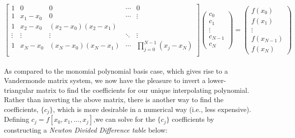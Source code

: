 \documentclass[paper=a4, fontsize=11pt]{scrartcl} %
\numberwithin{equation}{section} %
\numberwithin{figure}{section} %
\numberwithin{table}{section} %
\begin{document}
$$\left[ \begin{array}{ccccc}
1 	  & 0 	            & 0 			   & \cdots   & 0 \\
1         & x_1-x_0 &  0                                &\cdots   &\vdots \\
1         &x_2-x_0  & (x_2-x_0)(x_2-x_1) &              & \\
\vdots & \vdots    & \vdots		             & \ddots  & \vdots \\
1         &x_N-x_0 & (x_N-x_0)(x_N-x_1) & \cdots  & \prod_{j=0}^{N-1} (x_j-x_N) \\ 
\end{array} \right] %
%
\left( \begin{array}{c}
c_{0} \\
c_{1} \\
\vdots \\
c_{N-1} \\
c_{N}
\end{array} \right) =  
%
\left( \begin{array}{c}
f(x_0) \\
f(x_1) \\
\vdots \\
f(x_{N-1}) \\
f(x_{N})
\end{array} \right)$$\\

As compared to the monomial polynomial basis case, which gives rise to a Vandermonde matrix system, we now have the pleasure to invert a lower-triangular matrix to find the coefficients for our unique interpolating polynomial. \\

Rather than inverting the above matrix, there is another way to find the coefficients, $\{c_j\}$, which is more desirable in a numerical way (i.e., less expensive). Defining $c_j = f[x_0,x_1,...,x_j]$,we can solve for the $\{c_j\}$ coefficients by constructing a \emph{Newton Divided Difference table} below:
\end{document}
